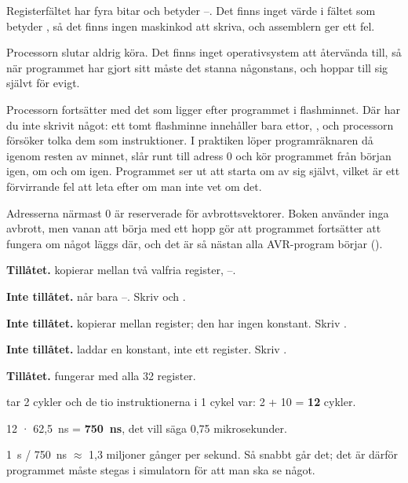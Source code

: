 Registerfältet har fyra bitar och betyder --. Det finns inget värde i
fältet som betyder , så det finns ingen maskinkod att skriva, och assemblern ger ett fel.

Processorn slutar aldrig köra. Det finns inget operativsystem att återvända till, så när
programmet har gjort sitt måste det stanna någonstans, och  hoppar till sig självt
för evigt.

Processorn fortsätter med det som ligger efter programmet i flashminnet. Där har du inte
skrivit något: ett tomt flashminne innehåller bara ettor, , och processorn försöker
tolka dem som instruktioner. I praktiken löper programräknaren då igenom resten av minnet, slår
runt till adress 0 och kör programmet från början igen, om och om igen. Programmet ser ut att
starta om av sig självt, vilket är ett förvirrande fel att leta efter om man inte vet om det.

Adresserna närmast 0 är reserverade för avbrottsvektorer. Boken använder inga avbrott, men
vanan att börja med ett hopp gör att programmet fortsätter att fungera om något läggs där, och det
är så nästan alla AVR-program börjar ().

\textbf{Tillåtet.}  kopierar mellan två valfria register, --.

\textbf{Inte tillåtet.}  når bara --. Skriv
 och .

\textbf{Inte tillåtet.}  kopierar mellan register; den har ingen konstant. Skriv
.

\textbf{Inte tillåtet.}  laddar en konstant, inte ett register. Skriv
.

\textbf{Tillåtet.}  fungerar med alla 32 register.

 tar 2 cykler och de tio instruktionerna i  1 cykel var:
2 + 10 = \textbf{12} cykler.

12 · 62,5~ns = \textbf{750~ns}, det vill säga 0,75 mikrosekunder.

1~s / 750~ns $\approx$ 1,3 miljoner gånger per sekund. Så snabbt går det; det är därför
programmet måste stegas i simulatorn för att man ska se något.

